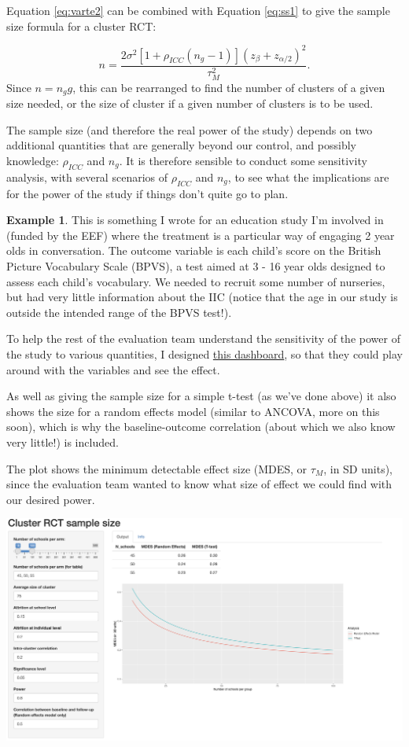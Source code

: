 \documentclass[
  openany]{book}
\theoremstyle{definition}
\theoremstyle{definition}
\newtheorem{example}{Example}[chapter]
\theoremstyle{definition}
\theoremstyle{definition}
\theoremstyle{remark}
\begin{document}
Equation \eqref{eq:varte2} can be combined with Equation \eqref{eq:ss1} to give the sample size formula for a cluster RCT:

\[n = \frac{2\sigma^2\left[1 + \rho_{ICC}\left(n_g-1\right)\right]\left(z_{\beta} + z_{\alpha/2}\right)^2}{\tau^2_M}.
 \]
Since \(n=n_gg\), this can be rearranged to find the number of clusters of a given size needed, or the size of cluster if a given number of clusters is to be used.

The sample size (and therefore the real power of the study) depends on two additional quantities that are generally beyond our control, and possibly knowledge: \(\rho_{ICC}\) and \(n_g\). It is therefore sensible to conduct some sensitivity analysis, with several scenarios of \(\rho_{ICC}\) and \(n_g\), to see what the implications are for the power of the study if things don't quite go to plan.

\begin{example}
This is something I wrote for an education study I'm involved in (funded by the EEF) where the treatment is a particular way of engaging 2 year olds in conversation. The outcome variable is each child's score on the British Picture Vocabulary Scale (BPVS), a test aimed at 3 - 16 year olds designed to assess each child's vocabulary. We needed to recruit some number of nurseries, but had very little information about the IIC (notice that the age in our study is outside the intended range of the BPVS test!).

To help the rest of the evaluation team understand the sensitivity of the power of the study to various quantities, I designed \href{https://racheloughton.shinyapps.io/sample_size/}{this dashboard}, so that they could play around with the variables and see the effect.

As well as giving the sample size for a simple t-test (as we've done above) it also shows the size for a random effects model (similar to ANCOVA, more on this soon), which is why the baseline-outcome correlation (about which we also know very little!) is included.

The plot shows the minimum detectable effect size (MDES, or \(\tau_M\), in SD units), since the evaluation team wanted to know what size of effect we could find with our desired power.

\includegraphics{images/Screenshot_shiny.png}
\end{example}
\end{document}
